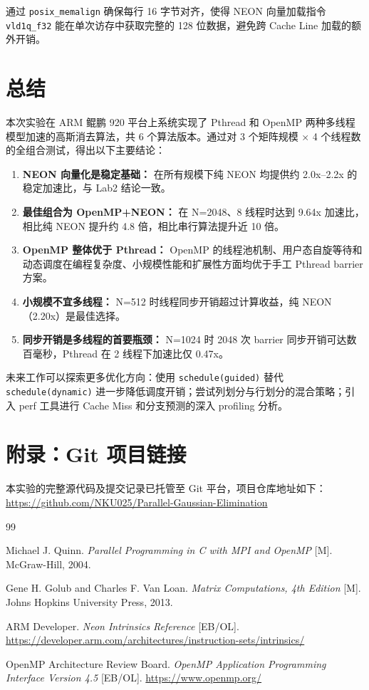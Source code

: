 \documentclass[a4paper]{article}
\begin{document}
通过 \texttt{posix\_memalign} 确保每行 16 字节对齐，使得 NEON 向量加载指令 \texttt{vld1q\_f32} 能在单次访存中获取完整的 128 位数据，避免跨 Cache Line 加载的额外开销。

\section{总结}

本次实验在 ARM 鲲鹏 920 平台上系统实现了 Pthread 和 OpenMP 两种多线程模型加速的高斯消去算法，共 6 个算法版本。通过对 3 个矩阵规模 × 4 个线程数的全组合测试，得出以下主要结论：

\begin{enumerate}
    \item \textbf{NEON 向量化是稳定基础：} 在所有规模下纯 NEON 均提供约 2.0x--2.2x 的稳定加速比，与 Lab2 结论一致。
    \item \textbf{最佳组合为 OpenMP+NEON：} 在 N=2048、8 线程时达到 9.64x 加速比，相比纯 NEON 提升约 4.8 倍，相比串行算法提升近 10 倍。
    \item \textbf{OpenMP 整体优于 Pthread：} OpenMP 的线程池机制、用户态自旋等待和动态调度在编程复杂度、小规模性能和扩展性方面均优于手工 Pthread barrier 方案。
    \item \textbf{小规模不宜多线程：} N=512 时线程同步开销超过计算收益，纯 NEON（2.20x）是最佳选择。
    \item \textbf{同步开销是多线程的首要瓶颈：} N=1024 时 2048 次 barrier 同步开销可达数百毫秒，Pthread 在 2 线程下加速比仅 0.47x。
\end{enumerate}

未来工作可以探索更多优化方向：使用 \texttt{schedule(guided)} 替代 \texttt{schedule(dynamic)} 进一步降低调度开销；尝试列划分与行划分的混合策略；引入 perf 工具进行 Cache Miss 和分支预测的深入 profiling 分析。

\newpage
\section*{附录：Git 项目链接}
本实验的完整源代码及提交记录已托管至 Git 平台，项目仓库地址如下：\\
\url{https://github.com/NKU025/Parallel-Gaussian-Elimination}

\renewcommand{\refname}{参考文献}
\begin{thebibliography}{99}

Michael J. Quinn.
\textit{Parallel Programming in C with MPI and OpenMP} [M].
McGraw-Hill, 2004.

Gene H. Golub and Charles F. Van Loan.
\textit{Matrix Computations, 4th Edition} [M].
Johns Hopkins University Press, 2013.

ARM Developer.
\textit{Neon Intrinsics Reference} [EB/OL].
\url{https://developer.arm.com/architectures/instruction-sets/intrinsics/}

OpenMP Architecture Review Board.
\textit{OpenMP Application Programming Interface Version 4.5} [EB/OL].
\url{https://www.openmp.org/}

\end{thebibliography}
\end{document}
